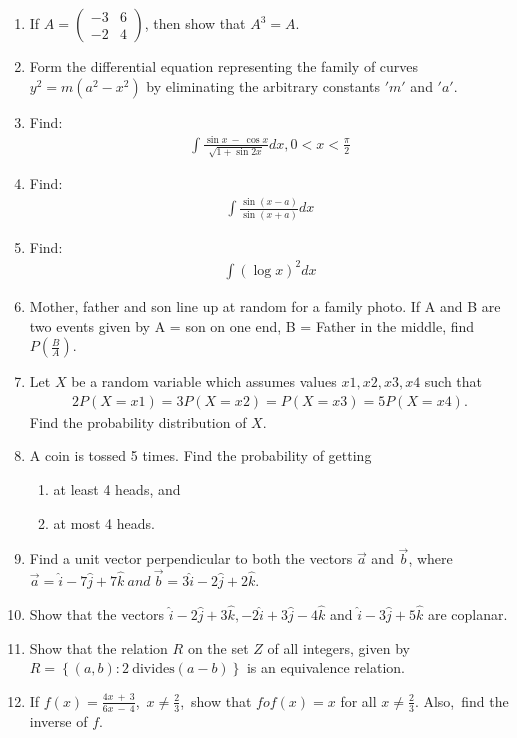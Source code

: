 \documentclass[10pt,-letter paper]{article}
\providecommand{\cbrak}[1]{\ensuremath{\left\{#1\right\}}}
\providecommand{\brak}[1]{\ensuremath{\left(#1\right)}}
\newcommand{\myvec}[1]{\ensuremath{\begin{pmatrix}#1\end{pmatrix}}}
\begin{document}
\begin{enumerate}
\item If $A=\myvec{-3 & 6 \\ -2 & 4}$, then show that ${A}^3=A$.
\item Form the differential equation representing the family of curves ${y}^2=m\brak{{a}^2-{x}^2}$ by eliminating the arbitrary constants $'m'$ and $'a'$.
\item Find: 
	\begin{align*}
		\int\frac{\sin{x}~-~\cos{x}}{\sqrt{1+\sin{2x}}}dx, 0<x<\frac{\pi}{2}
	\end{align*}
\item Find: 
	\begin{align*}
		\int\frac{\sin\brak{x-a}}{\sin\brak{x+a}}dx
	\end{align*}
\item Find:
	\begin{align*}
	\int\brak{\log{x}}^2dx
\end{align*}
\item Mother, father and son line up at random for a family photo. If A and B are two events given by A = son on one end, B = Father in the middle, find $P\brak{\frac{B}{A}}$.
\item Let ${X}$ be a random variable which assumes values ${x1},{x2},{x3},{x4}$ such that
	\begin{align*}
		2P\brak{X = x1} = 3P\brak{X = x2} = P\brak{X = x3} = 5P\brak{X = x4}.
	\end{align*}
		Find the probability distribution of ${X}$.
\item A coin is tossed 5 times. Find the probability of getting 
	\begin{enumerate}[label = (\roman*)]
		\item at least 4 heads, and 
		\item at most 4 heads.
	\end{enumerate}
\item Find a unit vector perpendicular to both the vectors $\overrightarrow{a}$ and $\overrightarrow{b}$, where $\overrightarrow{a} = \hat{i} - 7\hat{j} + 7\hat{k}~and~\overrightarrow{b} = 3\hat{i} - 2\hat{j} + 2\hat{k}$.
\item Show that the vectors $\hat{i} - 2\hat{j} + 3\hat{k}, - 2\hat{i} + 3\hat{j} - 4\hat{k}$ and $\hat{i} - 3\hat{j} + 5\hat{k}$ are coplanar.
\item Show that the relation $R$ on the set $Z$ of all integers, given by $R = \cbrak{\brak{a,b} : 2~\text{divides} \brak{a-b}}$ is an equivalence relation.
\item If $f\brak{x}= \frac{4{x}~+~3}{6{x}~-~4}$,~${x} \neq\frac{2}{3}$,~show that $fof\brak{x} = {x}$ for all ${x} \neq\frac{2}{3}$. Also,~find the inverse of ${f}$.

\end{enumerate}
\end{document}

